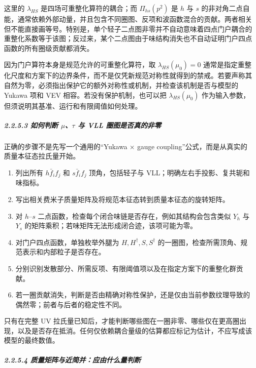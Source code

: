 \documentclass[
  chinese,
  UTF8]{ctexart}
\providecommand{\tightlist}{%
  \setlength{\itemsep}{0pt}\setlength{\parskip}{0pt}}
\begin{document}
这里的 \(\lambda_{HS}\) 是四场可重整化算符的耦合；而 \(\Pi_{hs}(p^2)\)
是 \(h\) 与 \(s\)
的非对角二点自能，通常依赖外部动量，并且包含不同圈图、反项和波函数混合的贡献。两者相关但不能直接画等号。特别是，单个轻子二点图非零并不自动意味着四点门户耦合的重整化系数等于该图；反过来，某个二点图由于味结构消失也不自动证明门户四点函数的所有圈级贡献都消失。

因为门户算符本身是规范允许的可重整化算符，取 \(\lambda_{HS}(\mu_0)=0\)
通常是指定重整化尺度和方案下的边界条件，而不是仅凭新规范对称性就得到的禁戒。若要声称其自然为零，必须指出保护它的额外对称性或机制，并检查该机制是否与模型的
Yukawa 项和 VEV 相容。若没有保护机制，也可以把 \(\lambda_{HS}(\mu_0)\)
作为输入参数，但须说明其基准、运行和有限阈值如何处理。

\subparagraph{\texorpdfstring{2.2.5.3 如何判断
\ensuremath{\mu}、\ensuremath{\tau} 与 VLL
圈图是否真的非零}{2.2.5.3 如何判断 、 与 VLL 圈图是否真的非零}}\label{ux5982ux4f55ux5224ux65ad-ux4e0e-vll-ux5708ux56feux662fux5426ux771fux7684ux975eux96f6}

正确的步骤不是先写一个通用的``Yukawa × gauge
coupling''公式，而是从真实的质量本征态拉氏量开始。

\begin{enumerate}
\def\labelenumi{\arabic{enumi}.}
\tightlist
\item
  列出所有 \(h\bar f_i f_j\) 和 \(s\bar f_i f_j\) 顶角，包括轻子与
  VLL；明确左右手投影、复共轭和味指标。
\item
  写出相关费米子质量矩阵及将规范本征态转到质量本征态的旋转矩阵。
\item
  对 \(h\)--\(s\)
  二点函数，检查每个闭合味链是否存在，例如其结构会包含类似 \(Y_h\) 与
  \(Y_s\) 的矩阵乘积；若味矩阵无法形成闭合迹，该项可能为零。
\item
  对门户四点函数，单独枚举外腿为 \(H,H^\dagger,S,S^\dagger\)
  的一圈图，检查所需顶角、规范表示和内部粒子是否存在。
\item
  分别识别发散部分、所需反项、有限阈值项以及在指定方案下的重整化群贡献。
\item
  若一圈贡献消失，判断是否由精确对称性保护，还是仅由当前参数纹理导致的偶然零；前者与后者的稳定性不同。
\end{enumerate}

只有在完整 UV
拉氏量已知后，才能判断哪些图在一圈非零、哪些仅在更高圈出现，以及是否存在抵消。任何仅依赖耦合量级的估算都应标记为估计，不应写成该模型的最终数值。

\subparagraph{2.2.5.4
质量矩阵与近简并：应由什么量判断}\label{ux8d28ux91cfux77e9ux9635ux4e0eux8fd1ux7b80ux5e76ux5e94ux7531ux4ec0ux4e48ux91cfux5224ux65ad}
\end{document}
